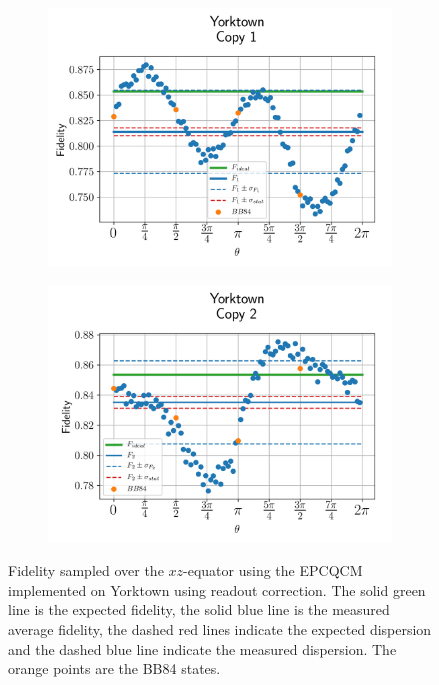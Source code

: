\begin{figure}[H]
  \centering
  \begin{subfigure}{.5\textwidth}
    \centering
    \includegraphics[width=\textwidth]{Figures/Economical/IBM/OnlyEquator/results_corrected_ibmqx2_copy1.png}
    \label{fig:epc_corrected_yorktown_equator_1}
  \end{subfigure}%
  \begin{subfigure}{.5\textwidth}
    \centering
    \includegraphics[width=\textwidth]{Figures/Economical/IBM/OnlyEquator/results_corrected_ibmqx2_copy2.png}
    \label{fig:epc_corrected_yorktown_equator_2}
  \end{subfigure}
  \vspace{-0.5cm}
  \caption{Fidelity sampled over the $xz$-equator using the EPCQCM implemented on Yorktown using readout correction. The solid green line is the expected fidelity, the solid blue line is the measured average fidelity, the dashed red lines indicate the expected dispersion and the dashed blue line indicate the measured dispersion. The orange points are the BB84 states.}
  \label{fig:epc_corrected_yorktown_equator}
\end{figure}

